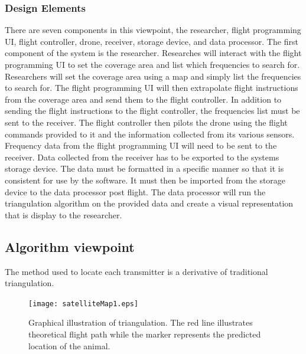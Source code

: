 \documentclass[onecolumn, draftclsnofoot,10pt, compsoc]{IEEEtran}
\begin{document}
\subsubsection{Design Elements}
There are seven components in this viewpoint, the researcher, flight programming UI, flight controller, drone, receiver, storage device, and data processor.
The first component of the system is the researcher. Researches will interact with the flight programming UI to set the coverage area and list which frequencies to search for.
Researchers will set the coverage area using a map and simply list the frequencies to search for.
The flight programming UI will then extrapolate flight instructions from the coverage area and send them to the flight controller.
In addition to sending the flight instructions to the flight controller, the frequencies list must be sent to the receiver.
The flight controller then pilots the drone using the flight commands provided to it and the information collected from its various sensors.
Frequency data from the flight programming UI will need to be sent to the receiver.
Data collected from the receiver has to be exported to the systems storage device.
The data must be formatted in a specific manner so that it is consistent for use by the software.
It must then be imported from the storage device to the data processor post flight.
The data processor will run the triangulation algorithm on the provided data and create a visual representation that is display to the researcher.

\subsection{Algorithm viewpoint}
The method used to locate each transmitter is a derivative of traditional triangulation.
\begin{figure}[h]
\texttt{[image: satelliteMap1.eps]}
\captionsetup{justification=centering}
\caption{Graphical illustration of triangulation. The red line illustrates theoretical flight path while the marker represents the predicted location of the animal.}
\centering
\end{figure}
\end{document}
